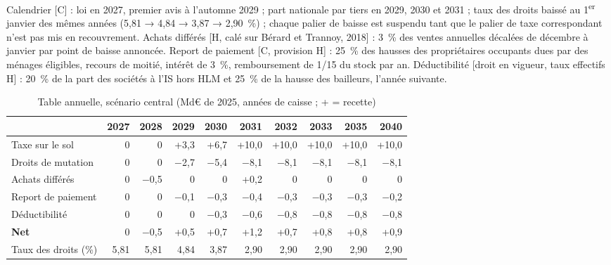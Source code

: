 Calendrier [C] : loi en 2027, premier avis à l'automne 2029 ; part nationale par tiers en 2029, 2030 et 2031 ; taux des
droits baissé au 1\textsuperscript{er} janvier des mêmes années (5,81 → 4,84 → 3,87 → 2,90~\%) ; chaque palier de
baisse est suspendu tant que le palier de taxe correspondant n'est pas mis en recouvrement. Achats différés [H, calé sur
Bérard et Trannoy, 2018] : 3~\% des ventes annuelles décalées de décembre à janvier par point de baisse annoncée. Report
de paiement [C, provision H] : 25~\% des hausses des propriétaires occupants dues par des ménages éligibles, recours de
moitié, intérêt de 3~\%, remboursement de 1/15 du stock par an. Déductibilité [droit en vigueur, taux effectifs H] :
20~\% de la part des sociétés à l'IS hors HLM et 25~\% de la hausse des bailleurs, l'année suivante.

\begin{table}[!htbp]\centering\scriptsize
\caption{Table annuelle, scénario central (Md€ de 2025, années de caisse ; + = recette)}\label{tab:fon4_traj}
\setlength{\tabcolsep}{3.5pt}
\begin{tabular}{@{}lrrrrrrrrr@{}}
\toprule
 & 2027 & 2028 & 2029 & 2030 & 2031 & 2032 & 2033 & 2035 & 2040 \\
\midrule
Taxe sur le sol & 0 & 0 & +3,3 & +6,7 & +10,0 & +10,0 & +10,0 & +10,0 & +10,0 \\
Droits de mutation & 0 & 0 & $-$2,7 & $-$5,4 & $-$8,1 & $-$8,1 & $-$8,1 & $-$8,1 & $-$8,1 \\
Achats différés & 0 & $-$0,5 & 0 & 0 & +0,2 & 0 & 0 & 0 & 0 \\
Report de paiement & 0 & 0 & $-$0,1 & $-$0,3 & $-$0,4 & $-$0,3 & $-$0,3 & $-$0,3 & $-$0,2 \\
Déductibilité & 0 & 0 & 0 & $-$0,3 & $-$0,6 & $-$0,8 & $-$0,8 & $-$0,8 & $-$0,8 \\
\textbf{Net} & 0 & $-$0,5 & +0,5 & +0,7 & +1,2 & +0,7 & +0,8 & +0,8 & +0,9 \\
Taux des droits (\%) & 5,81 & 5,81 & 4,84 & 3,87 & 2,90 & 2,90 & 2,90 & 2,90 & 2,90 \\
\bottomrule
\end{tabular}
\par{}
\end{table}

